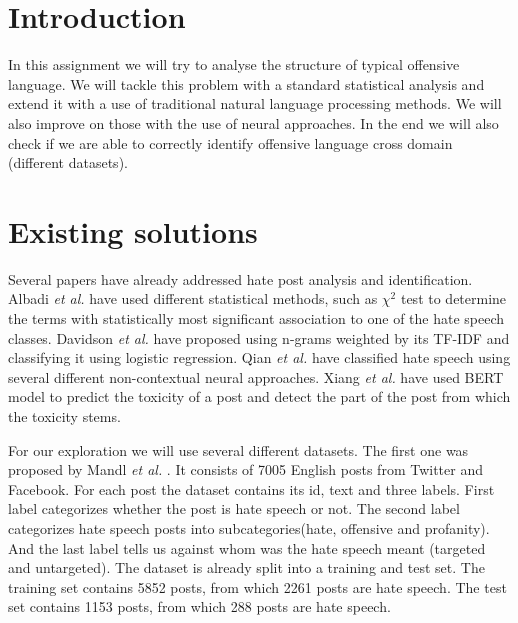 \documentclass[fleqn,moreauthors,10pt]{ds_report}
\affiliation{\textit{Advisors: Slavko Žitnik}}
\begin{document}
\flushbottom 

\maketitle 

\thispagestyle{empty} 


\section*{Introduction}

In this assignment we will try to analyse the structure of typical offensive language. We will tackle this problem with a standard statistical analysis and extend it with a use of traditional natural language processing methods. We will also improve on those with the use of neural approaches. In the end we will also check if we are able to correctly identify offensive language cross domain (different datasets).



\section*{Existing solutions}

Several papers have already addressed hate post analysis and identification. Albadi \textit{et al.} \cite{twitter-arabski} have used different statistical methods, such as $\chi^2$ test to determine the terms with statistically most significant association to one of the hate speech classes. Davidson \textit{et al.} \cite{angleski-traditional} have proposed using n-grams weighted by its TF-IDF and classifying it using logistic regression. Qian \textit{et al.} \cite{reddit} have classified hate speech using several different non-contextual neural approaches. Xiang \textit{et al.} \cite{bert-toxccin} have used BERT model to predict the toxicity of a post and detect the part of the post from which the toxicity stems.

For our exploration we will use several different datasets. The first one was proposed by Mandl \textit{et al.} \cite{HASOC}. It consists of 7005 English posts from Twitter and Facebook. For each post the dataset contains its id, text and three labels. First label categorizes whether the post is hate speech or not. The second label categorizes hate speech posts into subcategories(hate, offensive and profanity). And the last label tells us against whom was the hate speech meant (targeted and untargeted). The dataset is already split into a training and test set. The training set contains 5852 posts, from which 2261 posts are hate speech. The test set contains 1153 posts, from which 288 posts are hate speech.
\end{document}
